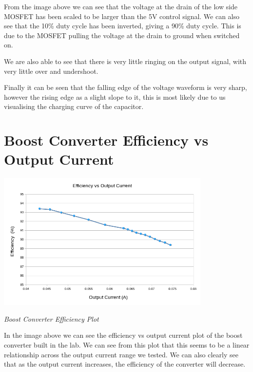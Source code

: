 \documentclass[a4paper,11pt]{article}
\begin{document}
\begin{preview}
From the image above we can see that the voltage at the drain of the low side MOSFET has been scaled to be larger than the 5V control signal. We can also see that the 10\% duty cycle has been inverted, giving a 90\% duty cycle. This is due to the MOSFET pulling the voltage at the drain to ground when switched on. 

We are also able to see that there is very little ringing on the output signal, with very little over and undershoot. 

Finally it can be seen that the falling edge of the voltage waveform is very sharp, however the rising edge as a slight slope to it, this is most likely due to us visualising the charging curve of the capacitor.


\section{Boost Converter Efficiency vs Output Current}

\begin{center}
  \includegraphics[width = 0.8\textwidth]{Efficiency.png}

  \textit{Boost Converter Efficiency Plot}
\end{center}

In the image above we can see the efficiency vs output current plot of the boost converter built in the lab. We can see from this plot that this seems to be a linear relationship across the output current range we tested. We can also clearly see that as the output current increases, the efficiency of the converter will decrease.


\end{preview}
\end{document}
